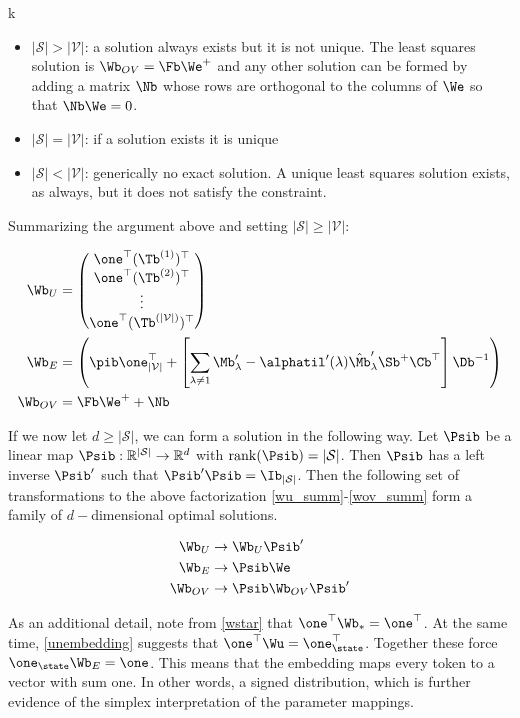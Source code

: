 k\documentclass{article}
\begin{document}
\begin{itemize}
    \item $\mathbf{|\mathcal{S}| > |\mathcal{V}|}$: a solution always exists but it is not unique. The least squares solution is $\Wb_{OV} = \Fb \We^+$ and any other solution can be formed by adding a matrix $\Nb$ whose rows are orthogonal to the columns of $\We$ so that $\Nb \We = 0$. 
    \item $\mathbf{|\mathcal{S}| = |\mathcal{V}|}$: if a solution exists it is unique
    \item $\mathbf{|\mathcal{S}| < |\mathcal{V}|}$: generically no exact solution. A unique least squares solution exists, as always, but it does not satisfy the constraint.
\end{itemize}
Summarizing the argument above and setting $|\mathcal{S}| \ge |\mathcal{V}|$:

\begin{align}
    \Wb_U &= \begin{pmatrix}
        \one^\top (\Tb^{(1)})^\top \\
        \one^\top (\Tb^{(2)})^\top \\
        \vdots\\
        \one^\top (\Tb^{(|\mathcal{V}|)})^\top \label{wu_summ}
    \end{pmatrix} \\
    \Wb_E &= \left (\pib \one_{|\mathcal{V}|}^\top + \left[ \sum_{\lambda \neq 1} \Mb'_\lambda - \alphatil'(\lambda) \hat{\Mb}'_\lambda \Sb^{+}\Cb^\top\right ]  \Db^{-1}\right) \\
    \Wb_{OV} &= \Fb \We^+ + \Nb \label{wov_summ}
\end{align}

If we now let $d \ge |\mathcal{S}|$, we can form a solution in the following way. Let $\Psib$ be a linear map $\Psib : \mathbb{R}^{|\mathcal{S}|}\to \mathbb{R}^d$ with $\mathrm{rank}(\Psib) = |\mathcal{S}|$. Then $\Psib$ has a left inverse $\Psib'$ such that $\Psib' \Psib = \Ib_{|\mathcal{S}|}$. Then the following set of transformations to the above factorization \eqref{wu_summ}-\eqref{wov_summ} form a family of $d-$dimensional optimal solutions.

\begin{align}
    \Wb_U &\to \Wb_U \Psib' \\
    \Wb_E &\to \Psib \We \\
    \Wb_{OV} &\to  \Psib \Wb_{OV} \Psib'
\end{align}

As an additional detail, note from \eqref{wstar} that $\one^\top \Wb_* = \one^\top$. At the same time, \eqref{unembedding} suggests that $\one^\top\Wu = \one_\state^\top$. Together these force $\one_\state\Wb_E = \one$. This means that the embedding maps every token to a vector with sum one. In other words, a signed distribution, which is further evidence of the simplex interpretation of the parameter mappings. 
\end{document}
